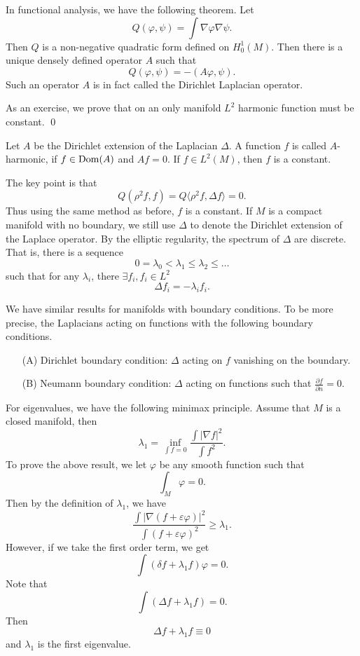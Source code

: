 In functional analysis, we have the following theorem.
Let 
\[ Q (\varphi, \psi)= \int \nabla \varphi \nabla \psi.\]
%
Then $Q$ is a non-negative quadratic form defined on $ H^1_0 (M)$. Then there is a unique densely defined operator $A$ such that 
%
\[ Q (\varphi, \psi) = - ( A \varphi , \psi). \]
%
Such an operator $A$ is in fact called the Dirichlet Laplacian operator.

As an exercise, we prove that on an only manifold $ L^2$ harmonic function must be constant.
\qed

\begin{theorem}
Let $ A $ be the Dirichlet extension of the Laplacian $\Delta $.  A function $f$ is called $A$-harmonic, if $ f \in {\rm Dom} (A) $ and $A f = 0 $. If $ f \in L^2 (M)$, then $f$ is a constant.
\end{theorem}

 The key point is that 
%
\[ Q (\rho ^2 f, f) = Q \langle  \rho^2 f , \Delta f \rangle = 0 .\]
Thus using the same method as before, $f $ is a constant.
If $ M$ is a compact manifold with no boundary,  we still use $\Delta$ to denote the Dirichlet extension of the Laplace operator. By the elliptic regularity, the spectrum of $ \Delta $ are discrete.  That is, there is a sequence
%
\[ 0 = \lambda _0 < \lambda _1  \leq \lambda _2 \leq \ldots \]
%
such that for any $\lambda_i$,  there $\exists f_i , f _i \in L^2 $
%
\[ \Delta f _i = - \lambda _i f_i. \]


We have similar results for manifolds with boundary conditions. To be more precise, the Laplacians acting on 
functions with the following boundary conditions.

\begin{enumerate}
  \item [(A)] Dirichlet boundary condition: $\Delta$ acting on $f$ vanishing on the boundary.
  \item [(B)] Neumann boundary condition: $ \Delta $ acting on functions such that $ \frac{\partial f}{\partial n} = 0 $.
 \end{enumerate}  
  
For eigenvalues, we have the following minimax principle. Assume that $M$  is a closed manifold, then
%
\[ \lambda _1 = \inf_{\int f = 0 } \frac{\int |\nabla f|^2}{\int f^2}.\]
%
To prove the above result, we let $ \varphi $ be any smooth function such that 
%
\[ \int_M \varphi = 0 .\]
%
Then by the definition of $ \lambda _1 $, we have 
%
\[\frac{\int | \nabla (f + \varepsilon \varphi )|^2}{\int (f + \varepsilon \varphi )^2} \geq \lambda _1 .\]
%
However, if we take the first order term, we get 
%
\[\int (\delta f + \lambda _1 f ) \varphi = 0 .\]
Note that 
%
\[ \int (\Delta f + \lambda _ 1 f ) = 0 .\]
%
Then 
%
\[\Delta f + \lambda _1 f \equiv 0 \]
%
and $ \lambda _ 1 $ is the first eigenvalue.

